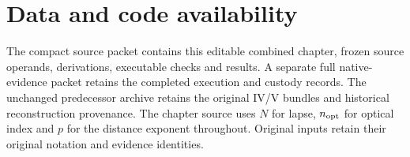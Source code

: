 \documentclass[10pt,twocolumn,letterpaper]{article}
\begin{document}
\section*{Data and code availability}
The compact source packet contains this editable combined chapter, frozen source operands, derivations, executable checks and results. A separate full native-evidence packet retains the completed execution and custody records. The unchanged predecessor archive retains the original IV/V bundles and historical reconstruction provenance. The chapter source uses $N$ for lapse, $n_{\rm opt}$ for optical index and $p$ for the distance exponent throughout. Original inputs retain their original notation and evidence identities.
\end{document}
